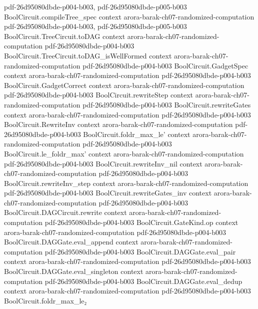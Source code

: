 \begin{theorem}
  {pdf-26d95080dbde-p004-b003,
    pdf-26d95080dbde-p005-b003}
\proofstep
  {BoolCircuit.compileTree_spec}
  {context}
  {arora-barak-ch07-randomized-computation}
  {pdf-26d95080dbde-p004-b003,
    pdf-26d95080dbde-p005-b003}
\proofstep
  {BoolCircuit.TreeCircuit.toDAG}
  {context}
  {arora-barak-ch07-randomized-computation}
  {pdf-26d95080dbde-p004-b003}
\proofstep
  {BoolCircuit.TreeCircuit.toDAG_isWellFormed}
  {context}
  {arora-barak-ch07-randomized-computation}
  {pdf-26d95080dbde-p004-b003}
\proofstep
  {BoolCircuit.GadgetSpec}
  {context}
  {arora-barak-ch07-randomized-computation}
  {pdf-26d95080dbde-p004-b003}
\proofstep
  {BoolCircuit.GadgetCorrect}
  {context}
  {arora-barak-ch07-randomized-computation}
  {pdf-26d95080dbde-p004-b003}
\proofstep
  {BoolCircuit.rewriteStep}
  {context}
  {arora-barak-ch07-randomized-computation}
  {pdf-26d95080dbde-p004-b003}
\proofstep
  {BoolCircuit.rewriteGates}
  {context}
  {arora-barak-ch07-randomized-computation}
  {pdf-26d95080dbde-p004-b003}
\proofstep
  {BoolCircuit.RewriteInv}
  {context}
  {arora-barak-ch07-randomized-computation}
  {pdf-26d95080dbde-p004-b003}
\proofstep
  {BoolCircuit.foldr_max_le'}
  {context}
  {arora-barak-ch07-randomized-computation}
  {pdf-26d95080dbde-p004-b003}
\proofstep
  {BoolCircuit.le_foldr_max'}
  {context}
  {arora-barak-ch07-randomized-computation}
  {pdf-26d95080dbde-p004-b003}
\proofstep
  {BoolCircuit.rewriteInv_nil}
  {context}
  {arora-barak-ch07-randomized-computation}
  {pdf-26d95080dbde-p004-b003}
\proofstep
  {BoolCircuit.rewriteInv_step}
  {context}
  {arora-barak-ch07-randomized-computation}
  {pdf-26d95080dbde-p004-b003}
\proofstep
  {BoolCircuit.rewriteGates_inv}
  {context}
  {arora-barak-ch07-randomized-computation}
  {pdf-26d95080dbde-p004-b003}
\proofstep
  {BoolCircuit.DAGCircuit.rewrite}
  {context}
  {arora-barak-ch07-randomized-computation}
  {pdf-26d95080dbde-p004-b003}
\proofstep
  {BoolCircuit.GateKind.op}
  {context}
  {arora-barak-ch07-randomized-computation}
  {pdf-26d95080dbde-p004-b003}
\proofstep
  {BoolCircuit.DAGGate.eval_append}
  {context}
  {arora-barak-ch07-randomized-computation}
  {pdf-26d95080dbde-p004-b003}
\proofstep
  {BoolCircuit.DAGGate.eval_pair}
  {context}
  {arora-barak-ch07-randomized-computation}
  {pdf-26d95080dbde-p004-b003}
\proofstep
  {BoolCircuit.DAGGate.eval_singleton}
  {context}
  {arora-barak-ch07-randomized-computation}
  {pdf-26d95080dbde-p004-b003}
\proofstep
  {BoolCircuit.DAGGate.eval_dedup}
  {context}
  {arora-barak-ch07-randomized-computation}
  {pdf-26d95080dbde-p004-b003}
\proofstep
  {BoolCircuit.foldr_max_le₂}

\end{theorem}
